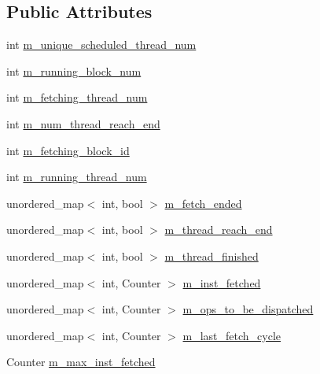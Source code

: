 \subsection*{Public Attributes}
\begin{DoxyCompactItemize}
\item 
int \hyperlink{classcore__c_aed9d122b2ca3860330f9c022864f902f}{m\_\-unique\_\-scheduled\_\-thread\_\-num}
\item 
int \hyperlink{classcore__c_a6932b52cf2dc0a9c642aaf4177c365d6}{m\_\-running\_\-block\_\-num}
\item 
int \hyperlink{classcore__c_a7d7c4ac42b94e7bc0cbdc03f64b390e0}{m\_\-fetching\_\-thread\_\-num}
\item 
int \hyperlink{classcore__c_abe6acae404f632cae581831f581a3a93}{m\_\-num\_\-thread\_\-reach\_\-end}
\item 
int \hyperlink{classcore__c_a24aae8bf7cbba3721c5c94c0bbfa3a67}{m\_\-fetching\_\-block\_\-id}
\item 
int \hyperlink{classcore__c_a5abf4a988618cbe68a5aea86ca161530}{m\_\-running\_\-thread\_\-num}
\item 
unordered\_\-map$<$ int, bool $>$ \hyperlink{classcore__c_a51b424c11b010c0ade2f8da3ad5b041d}{m\_\-fetch\_\-ended}
\item 
unordered\_\-map$<$ int, bool $>$ \hyperlink{classcore__c_a91a431d714f4e1872d994db0308ca801}{m\_\-thread\_\-reach\_\-end}
\item 
unordered\_\-map$<$ int, bool $>$ \hyperlink{classcore__c_a1884615499931477e72852d7cb13241d}{m\_\-thread\_\-finished}
\item 
unordered\_\-map$<$ int, Counter $>$ \hyperlink{classcore__c_a113eb7ebc1c43c6b111a83d5fe791f75}{m\_\-inst\_\-fetched}
\item 
unordered\_\-map$<$ int, Counter $>$ \hyperlink{classcore__c_ad808d2cc32a42c817db163990b008369}{m\_\-ops\_\-to\_\-be\_\-dispatched}
\item 
unordered\_\-map$<$ int, Counter $>$ \hyperlink{classcore__c_a885c62130d2062aa971cee4d6c1169b9}{m\_\-last\_\-fetch\_\-cycle}
\item 
Counter \hyperlink{classcore__c_a8de59f8588f5fb79f027f20e478ec6f3}{m\_\-max\_\-inst\_\-fetched}
\end{DoxyCompactItemize}
